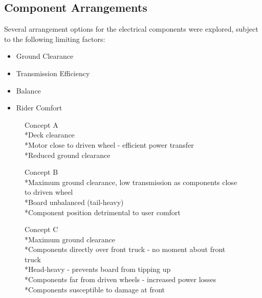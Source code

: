 \documentclass[journal,10pt]{IEEEtran}
\begin{document}
    \subsection{Component Arrangements}
        Several arrangement options for the electrical components were explored, subject to the following limiting factors:
        \begin{itemize}
            	\item Ground Clearance
            	\item Transmission Efficiency
            	\item Balance 
            	\item Rider Comfort
            \end{itemize}
        \begin{figure}[H]
                \centering
                \caption{
                Concept A
                \\*Deck clearance
                \\*Motor close to driven wheel - efficient power transfer
                \\*Reduced ground clearance}
                \label{fig:ConceptA}
            \end{figure} 
        \begin{figure}[H]
                \centering
                \caption{Concept B
                \\*Maximum ground clearance, low transmission as components close to driven wheel
                \\*Board unbalanced (tail-heavy)
                \\*Component position detrimental to user comfort}
                \label{fig:ConceptB}
            \end{figure}  
        \begin{figure}[H]
                \centering
                \caption{Concept C
                \\*Maximum ground clearance
                \\*Components directly over front truck - no moment about front truck
                \\*Head-heavy - prevents board from tipping up
                \\*Components far from driven wheels - increased power losses
                \\*Components susceptible to damage at front}
                \label{fig:ConceptC}
            \end{figure} 
\end{document}
